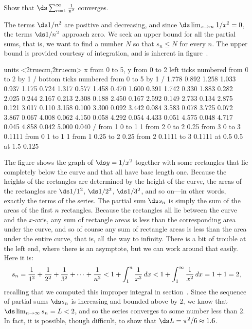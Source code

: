 \begin{example} Show that $\ds\sum_{n=1}^\infty {1\over n^2}$ converges.
\par\nobreak\ssk\noindent
The terms $\ds 1/n^2$ are  positive and decreasing, and since 
$\ds\lim_{x\to\infty} 1/x^2=0$, the terms $\ds 1/n^2$ approach zero. We
seek an upper bound for all the partial sums, that is, we want to find
a number $N$ so that $s_n\le N$ for every $n$. The upper bound is
provided courtesy of integration, and is inherent in
figure~.

\figure
\vbox{\beginpicture
\normalgraphs
\ninepoint
\setcoordinatesystem units <2truecm,2truecm>
\setplotarea x from 0 to 5, y from 0 to 2
\axis left ticks numbered from 0 to 2 by 1 /
\axis bottom  ticks numbered from 0 to 5 by 1 /
\setquadratic
{} 1.778 0.892 1.258 1.033 0.937 1.175 0.724 1.317 0.577 
1.458 0.470 1.600 0.391 1.742 0.330 1.883 0.282 2.025 0.244 
2.167 0.213 2.308 0.188 2.450 0.167 2.592 0.149 2.733 0.134 
2.875 0.121 3.017 0.110 3.158 0.100 3.300 0.092 3.442 0.084 
3.583 0.078 3.725 0.072 3.867 0.067 4.008 0.062 4.150 0.058 
4.292 0.054 4.433 0.051 4.575 0.048 4.717 0.045 4.858 0.042 
5.000 0.040 /
\putrule from 1 0 to 1 1 
\putrule from 2 0 to 2 0.25
\putrule from 3 0 to 3 0.1111
\putrule from 0 1 to 1 1 
\putrule from 1 0.25 to 2 0.25
\putrule from 2 0.1111 to 3 0.1111
\sevenpoint
{} at 0.5 0.5
 at 1.5 0.125
\endpicture}

The figure shows the graph of $\ds y=1/x^2$ together with some rectangles
that lie completely below the curve and that all have base length
one. Because the heights of the rectangles are determined by the
height of the curve, the areas of the rectangles are $\ds 1/1^2$, $\ds 1/2^2$,
$\ds 1/3^2$, and so on---in other words, exactly the terms of the
series. The partial sum $\ds s_n$ is simply the sum of the areas of the
first $n$ rectangles. Because the rectangles all lie between the curve
and the $x$-axis, any sum of rectangle areas is less than the
corresponding area under the curve, and so of course any sum of
rectangle areas is less than the area under the entire curve, that is,
all the way to infinity.
There is a bit of trouble at the
left end, where there is an asymptote, but we can work around that
easily. Here it is:
$$
  s_n={1\over 1^2}+{1\over 2^2}+{1\over 3^2}+\cdots+{1\over n^2}
  < 1 + \int_1^n {1\over x^2}\,dx < 1+\int_1^\infty {1\over x^2}\,dx 
  =1+1=2,
$$
recalling that we computed this improper integral in 
section~. Since the sequence of partial
sums $\ds s_n$ is increasing and bounded above by 2, we know that 
$\ds\lim_{n\to\infty}s_n=L<2$, and so the series converges to some
number less than 2. In fact, it is possible, though difficult, to show
that $\ds L=\pi^2/6\approx 1.6$.
\end{example}

